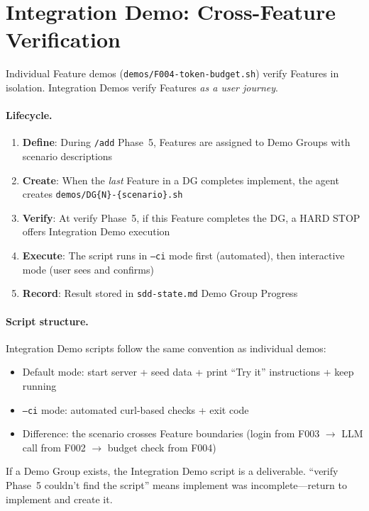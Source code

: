 \documentclass[11pt,a4paper,openright,twoside]{report}
\newcommand{\cmd}[1]{\texttt{/#1}}
\newcommand{\file}[1]{\texttt{#1}}
\begin{document}
\section{Integration Demo: Cross-Feature Verification}

Individual Feature demos (\file{demos/F004-token-budget.sh}) verify Features in isolation. Integration Demos verify Features \emph{as a user journey}.

\paragraph{Lifecycle.}
\begin{enumerate}[nosep]
  \item \textbf{Define}: During \cmd{add} Phase~5, Features are assigned to Demo Groups with scenario descriptions
  \item \textbf{Create}: When the \emph{last} Feature in a DG completes implement, the agent creates \file{demos/DG\{N\}-\{scenario\}.sh}
  \item \textbf{Verify}: At verify Phase~5, if this Feature completes the DG, a HARD STOP offers Integration Demo execution
  \item \textbf{Execute}: The script runs in \texttt{--ci} mode first (automated), then interactive mode (user sees and confirms)
  \item \textbf{Record}: Result stored in \file{sdd-state.md} Demo Group Progress
\end{enumerate}

\paragraph{Script structure.}
Integration Demo scripts follow the same convention as individual demos:
\begin{itemize}[nosep]
  \item Default mode: start server + seed data + print ``Try it'' instructions + keep running
  \item \texttt{--ci} mode: automated curl-based checks + exit code
  \item Difference: the scenario crosses Feature boundaries (login from F003 $\rightarrow$ LLM call from F002 $\rightarrow$ budget check from F004)
\end{itemize}

\begin{warnbox}
If a Demo Group exists, the Integration Demo script is a deliverable. ``verify Phase~5 couldn't find the script'' means implement was incomplete---return to implement and create it.
\end{warnbox}
\end{document}
